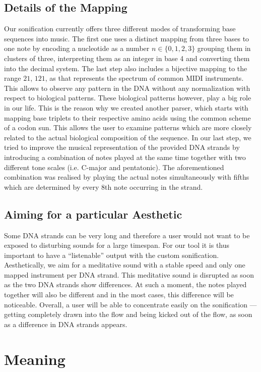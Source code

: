 \documentclass[10pt]{article}
\begin{document}
\subsection{Details of the Mapping}
Our sonification currently offers three different modes of transforming base sequences 
into music. The first one uses a distinct mapping from three bases to one note by encoding a nucleotide as a number $n \in \{0,1,2,3\}$ grouping them in clusters of three, interpreting 
them as an integer in base 4 and converting them into the decimal system. The last step also 
includes a bijective mapping to the range $21$, $121$, as that 
represents the spectrum of common MIDI instruments. This allows to observe any pattern in 
the DNA without any normalization with respect to biological patterns.
These biological patterns however, play a big role in our life. This is the reason why we 
created another parser, which starts with mapping base triplets to their respective amino acids 
using the common scheme of a codon sun. This allows the user to examine 
patterns which are more closely related to the actual biological composition of the sequence.
In our last step, we tried to improve the musical representation of the provided DNA strands 
by introducing a combination of notes played at the same time together with two different 
tone scales (i.e. C-major and pentatonic). The aforementioned combination was realised by 
playing the actual notes simultaneously with fifths which are determined by every 8th note 
occurring in the strand.
\subsection{Aiming for a particular Aesthetic}
Some DNA strands can be very long and therefore a user would not want to be 
exposed to disturbing sounds for a large timespan. For our tool it is thus important to have a 
“listenable” output with the custom sonification. Aesthetically, we aim for a meditative sound 
with a stable speed and only one mapped instrument per DNA strand. This meditative sound 
is disrupted as soon as the two DNA strands show differences. At such a moment, the notes 
played together will also be different and in the most cases, this difference will be noticeable. 
Overall, a user will be able to concentrate easily on the sonification — getting completely 
drawn into the flow and being kicked out of the flow, as soon as a difference in DNA strands 
appears.

\section{Meaning}
\end{document}
